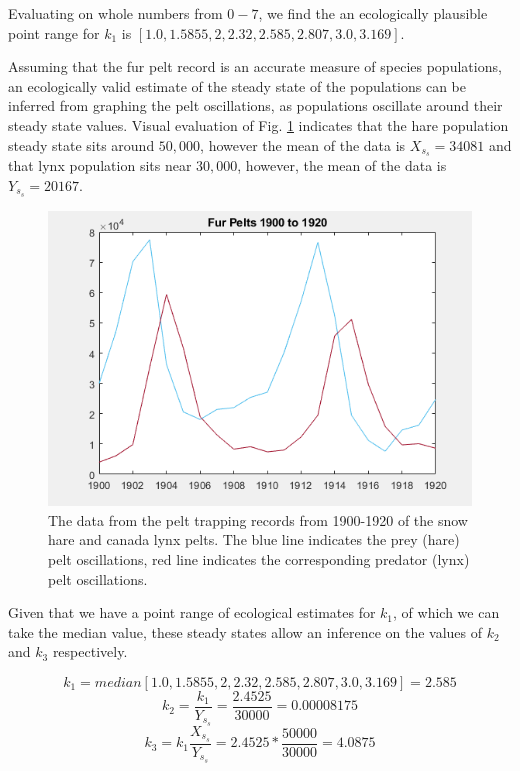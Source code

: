 \documentclass{article}
\begin{document}
Evaluating on whole numbers from $0-7$, we find the an ecologically plausible point range for $k_1$ is $[1.0, 1.5855, 2, 2.32, 2.585, 2.807, 3.0, 3.169]$. 

Assuming that the fur pelt record is an accurate measure of species populations, an ecologically valid estimate of the steady state of the populations can be inferred from graphing the pelt oscillations, as populations oscillate around their steady state values. Visual evaluation of Fig. \ref{fig:pelt_record} indicates that the hare population steady state sits around $50,000$, however the mean of the data is $X_s_s = 34081$ and that lynx population sits near $30,000$, however, the mean of the data is $Y_s_s = 20167$. 

\begin{figure}[H]
    \includegraphics[width = \textwidth]{fur_pelts.PNG}
    \caption{The data from the pelt trapping records from 1900-1920 of the snow hare and canada lynx pelts. The blue line indicates the prey (hare) pelt oscillations, red line indicates the corresponding predator (lynx) pelt oscillations.}
    \label{fig:pelt_record}
\end{figure}

Given that we have a point range of ecological estimates for $k_1$, of which we can take the median value, these steady states allow an inference on the values of $k_2$ and $k_3$ respectively. 

\begin{equation}
    k_1 = median[1.0, 1.5855, 2, 2.32, 2.585, 2.807, 3.0, 3.169] = 2.585
\end{equation}
\begin{equation}
    k_2 = \frac{k_1}{Y_s_s} = \frac{2.4525}{30000} = 0.00008175
\end{equation}
\begin{equation}
    k_3 = k_1\frac{X_s_s}{Y_s_s} = 2.4525*\frac{50000}{30000} = 4.0875
\end{equation}
\end{document}
